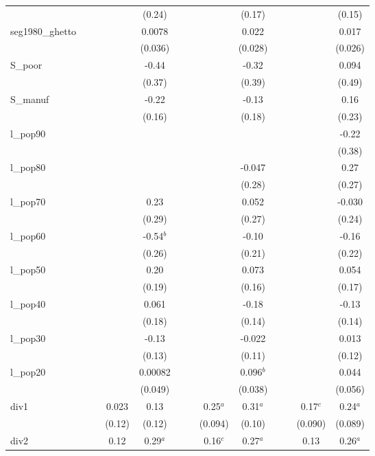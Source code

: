 \documentclass[]{article}
\begin{document}
\begin{tabular}{lcccccccccccc}
 &  &  &  & (0.24) &  &  &  & (0.17) &  &  &  & (0.15) \\
seg1980\_ghetto &  &  &  & 0.0078 &  &  &  & 0.022 &  &  &  & 0.017 \\
 &  &  &  & (0.036) &  &  &  & (0.028) &  &  &  & (0.026) \\
S\_poor &  &  &  & -0.44 &  &  &  & -0.32 &  &  &  & 0.094 \\
 &  &  &  & (0.37) &  &  &  & (0.39) &  &  &  & (0.49) \\
S\_manuf &  &  &  & -0.22 &  &  &  & -0.13 &  &  &  & 0.16 \\
 &  &  &  & (0.16) &  &  &  & (0.18) &  &  &  & (0.23) \\
l\_pop90 &  &  &  &  &  &  &  &  &  &  &  & -0.22 \\
 &  &  &  &  &  &  &  &  &  &  &  & (0.38) \\
l\_pop80 &  &  &  &  &  &  &  & -0.047 &  &  &  & 0.27 \\
 &  &  &  &  &  &  &  & (0.28) &  &  &  & (0.27) \\
l\_pop70 &  &  &  & 0.23 &  &  &  & 0.052 &  &  &  & -0.030 \\
 &  &  &  & (0.29) &  &  &  & (0.27) &  &  &  & (0.24) \\
l\_pop60 &  &  &  & -0.54$^b$ &  &  &  & -0.10 &  &  &  & -0.16 \\
 &  &  &  & (0.26) &  &  &  & (0.21) &  &  &  & (0.22) \\
l\_pop50 &  &  &  & 0.20 &  &  &  & 0.073 &  &  &  & 0.054 \\
 &  &  &  & (0.19) &  &  &  & (0.16) &  &  &  & (0.17) \\
l\_pop40 &  &  &  & 0.061 &  &  &  & -0.18 &  &  &  & -0.13 \\
 &  &  &  & (0.18) &  &  &  & (0.14) &  &  &  & (0.14) \\
l\_pop30 &  &  &  & -0.13 &  &  &  & -0.022 &  &  &  & 0.013 \\
 &  &  &  & (0.13) &  &  &  & (0.11) &  &  &  & (0.12) \\
l\_pop20 &  &  &  & 0.00082 &  &  &  & 0.096$^b$ &  &  &  & 0.044 \\
 &  &  &  & (0.049) &  &  &  & (0.038) &  &  &  & (0.056) \\
div1 &  &  & 0.023 & 0.13 &  &  & 0.25$^a$ & 0.31$^a$ &  &  & 0.17$^c$ & 0.24$^a$ \\
 &  &  & (0.12) & (0.12) &  &  & (0.094) & (0.10) &  &  & (0.090) & (0.089) \\
div2 &  &  & 0.12 & 0.29$^a$ &  &  & 0.16$^c$ & 0.27$^a$ &  &  & 0.13 & 0.26$^a$ \\

\end{tabular}
\end{document}
